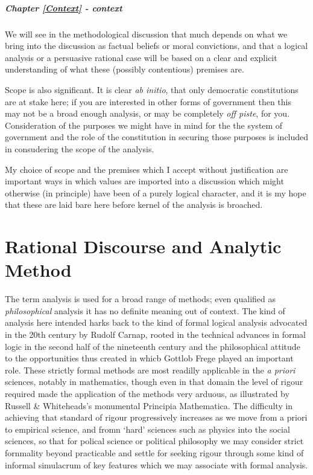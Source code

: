 \documentclass[10pt,titlepage]{book}
\begin{document}
\paragraph{Chapter \ref{Context} - context}

We will see in the methodological discussion that much depends on what we bring into the discussion as factual beliefs or moral convictions, and that a logical analysis or a persuasive rational case will be based on a clear and explicit understanding of what these (possibly contentious) premises are.

Scope is also significant.
It is clear {\it ab initio}, that only democratic constitutions are at stake here; if you are interested in other forms of government then this may not be a broad enough analysis, or may be completely {\it off piste}, for you.
Consideration of the purposes we might have in mind for the the system of government and the role of the constitution in securing those purposes is included in consudering the scope of the analysis.

My choice of scope and the premises which I accept without justification are important ways in which values are imported into a discussion which might otherwise (in principle) have been of a purely logical character, and it is my hope that these are laid bare here before kernel of the analysis is broached.

\chapter{Rational Discourse and Analytic Method}\label{Method}

The term analysis is used for a broad range of methods; even qualified as \emph{philosophical} analysis it has no definite meaning out of context.
The kind of analysis here intended harks back to the kind of formal logical analysis
advocated in the 20th century by Rudolf Carnap, rooted in the technical advances in
formal logic in the second half of the nineteenth century and the philosophical attitude to
the opportunities thus created in whicb Gottlob Frege played an important role.
These strictly formal methods are most readilly applicable in the \emph{a priori} sciences,
notably in mathematics, though even in that domain the level of rigour required made the
application of the methods very arduous, as illustrated by Russell \& Whiteheads’s monumental Principia Mathematica\cite{russell10}.
The difficulty in achieving that standard of rigour progressively increases as we move from a priori to empirical science, and fromn ‘hard’ sciences such as physics into
the social sciences, so that for polical science or political philosophy we may consider strict
fornmality beyond practicable and settle for seeking rigour through some kind of informal
simulacrum of key features which we may associate with formal analysis.
\end{document}
